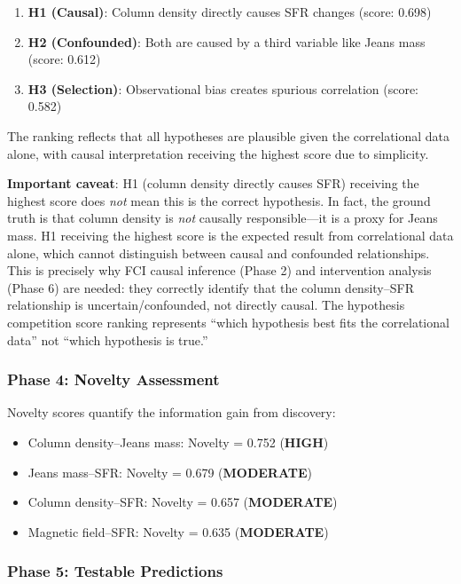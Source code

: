 \documentclass[usenatbib]{rasti}
\begin{document}
\begin{enumerate}
\item \textbf{H1 (Causal)}: Column density directly causes SFR changes (score: 0.698)
\item \textbf{H2 (Confounded)}: Both are caused by a third variable like Jeans mass (score: 0.612)
\item \textbf{H3 (Selection)}: Observational bias creates spurious correlation (score: 0.582)
\end{enumerate}

The ranking reflects that all hypotheses are plausible given the correlational data alone, with causal interpretation receiving the highest score due to simplicity.

\textbf{Important caveat}: H1 (column density directly causes SFR) receiving the highest score does \textit{not} mean this is the correct hypothesis. In fact, the ground truth is that column density is \textit{not} causally responsible---it is a proxy for Jeans mass. H1 receiving the highest score is the expected result from correlational data alone, which cannot distinguish between causal and confounded relationships. This is precisely why FCI causal inference (Phase 2) and intervention analysis (Phase 6) are needed: they correctly identify that the column density--SFR relationship is uncertain/confounded, not directly causal. The hypothesis competition score ranking represents ``which hypothesis best fits the correlational data'' not ``which hypothesis is true.''

\subsubsection{Phase 4: Novelty Assessment}

Novelty scores quantify the information gain from discovery:

\begin{itemize}
\item Column density--Jeans mass: Novelty = 0.752 (\textbf{HIGH})
\item Jeans mass--SFR: Novelty = 0.679 (\textbf{MODERATE})
\item Column density--SFR: Novelty = 0.657 (\textbf{MODERATE})
\item Magnetic field--SFR: Novelty = 0.635 (\textbf{MODERATE})
\end{itemize}

\subsubsection{Phase 5: Testable Predictions}
\end{document}
